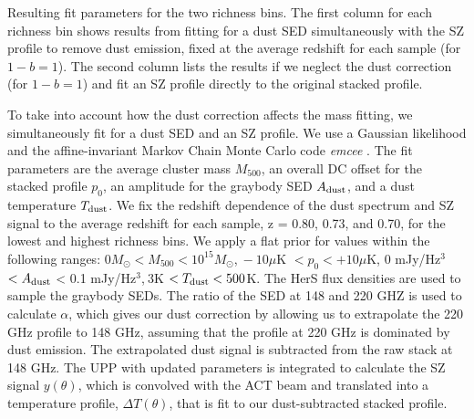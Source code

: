 \documentclass[a4paper,fleqn,usenatbib]{mnras}
\begin{document}
\begin{table}
\begin{threeparttable}
\begin{tabular}{|*{10}{c|}}
    \end{tabular}
  \begin{tablenotes}
	\item Resulting fit parameters for the two richness bins. The first column for each richness bin shows results from fitting for a dust SED simultaneously with the SZ profile to remove dust emission, fixed at the average redshift for each sample (for $1-b=1$). The second column lists the results if we neglect the dust correction (for $1-b=1$) and fit an SZ profile directly to the original stacked profile. %
  \end{tablenotes}
  \end{threeparttable}
\label{table:mcmcfitparam}
\end{table}


To take into account how the dust correction affects the mass fitting, we simultaneously fit for a dust SED and an SZ profile. We use a Gaussian likelihood and the affine-invariant Markov Chain Monte Carlo code \textit{emcee} \citep{2013PASP..125..306F}. The fit parameters are the average cluster mass $M_{500}$, an overall DC offset for the stacked profile $p_0$, an amplitude for the graybody SED $A_{\rm dust}$, and a dust temperature $T_{\rm dust}$. We fix the redshift dependence of the dust spectrum and SZ signal to the average redshift for each sample, z = 0.80, 0.73, and 0.70, for the lowest and highest richness bins. We apply a flat prior for values within the following ranges: $0 M_{\odot} <  M_{500} < 10^{15} M_{\odot}$,$\ -10 \mu$K $< p_0 < +10 \mu$K, 0 mJy/Hz$^3$ $< A_{\rm dust}$ < 0.1 mJy/Hz$^3$,$\ 3 $K $< T_{\rm dust} < 500$K. 
The HerS flux densities are used to sample the graybody SEDs. The ratio of the SED at 148 and 220 GHZ is used to calculate $\alpha$, which gives our dust correction by allowing us to extrapolate the 220 GHz profile to 148 GHz, assuming that the profile at 220 GHz is dominated by dust emission. The extrapolated dust signal is subtracted from the raw stack at 148 GHz.
The UPP with updated parameters is integrated to calculate the SZ signal $y(\theta)$, which is convolved with the ACT beam and translated into a temperature profile, $\Delta T(\theta)$, that is fit to our dust-subtracted stacked profile. 
\end{document}
